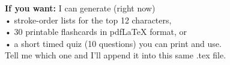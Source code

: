 \documentclass[12pt]{article}
\begin{document}
\begin{CJK}{UTF8}{gbsn}
\bigskip
\noindent\textbf{If you want:} I can generate (right now) \\
\quad • stroke-order lists for the top 12 characters, \\
\quad • 30 printable flashcards in pdfLaTeX format, or \\
\quad • a short timed quiz (10 questions) you can print and use. \\
Tell me which one and I’ll append it into this same .tex file.

\end{CJK}
\end{document}
